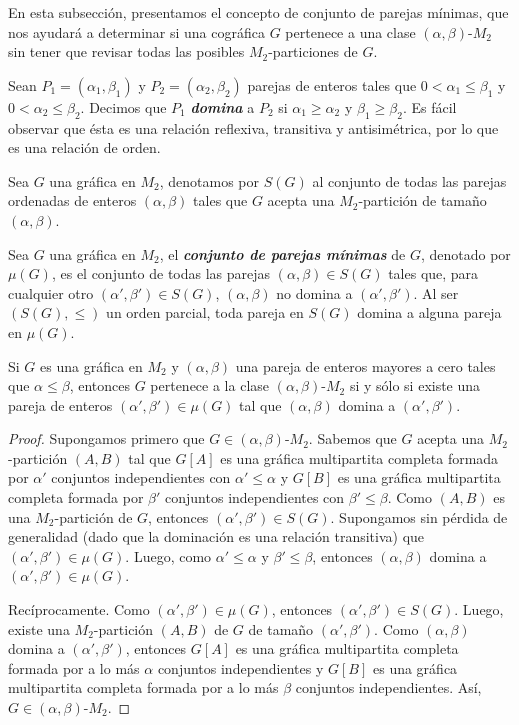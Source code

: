 En esta subsección, presentamos el concepto de conjunto de parejas mínimas, que nos ayudará a determinar si una cográfica $G$ pertenece a una clase $(\alpha, \beta)$-$M_2$ sin tener que revisar todas las posibles $M_2$-particiones de $G$.

Sean $P_1=(\alpha_1, \beta_1)$ y $P_2=(\alpha_2, \beta_2)$ parejas de enteros tales que $0 < \alpha_1 \le \beta_1$ y $0 < \alpha_2 \le \beta_2$. Decimos que $P_1$ \emph{\textbf{domina}} a $P_2$ si $\alpha_1 \geq \alpha_2$ y $\beta_1 \geq \beta_2$. Es f\'acil observar que ésta es una relación reflexiva, transitiva y antisim\'etrica, por lo que es una relaci\'on de orden.

Sea $G$ una gráfica en $M_2$, denotamos por $S(G)$ al conjunto de todas las parejas ordenadas de enteros $(\alpha, \beta)$ tales que $G$ acepta una $M_2$-partición de tamaño $(\alpha, \beta)$.

Sea $G$ una gráfica en $M_2$, el \textbf{\emph{conjunto de parejas mínimas}} de $G$, denotado por $\mu(G)$, es el conjunto de todas las parejas $(\alpha, \beta)\in S(G)$ tales que, para cualquier otro $(\alpha', \beta')\in S(G)$, $(\alpha, \beta)$ no domina a $(\alpha', \beta')$.   Al ser $(S(G), \le)$ un
orden parcial, toda pareja en $S(G)$ domina a alguna pareja en $\mu (G)$.

\begin{lemma}\label{lema_parejas_principal}
Si $G$ es una gráfica en $M_2$ y $(\alpha, \beta)$ una pareja de enteros mayores a cero tales que $\alpha \le \beta$, entonces $G$ pertenece a la clase $(\alpha, \beta)$-$M_2$ si y sólo si existe una pareja de enteros $(\alpha', \beta')\in \mu(G)$ tal que $(\alpha, \beta)$ domina a $(\alpha', \beta')$.
\end{lemma}

\begin{proof}
Supongamos primero que $G\in (\alpha, \beta)\text{-}M_2$. Sabemos que $G$
acepta una $M_2$-partición $(A,B)$ tal que $G[A]$ es una gráfica multipartita
completa formada por $\alpha'$ conjuntos independientes con $\alpha' \le
\alpha$ y $G[B]$ es una gráfica multipartita completa formada por $\beta'$
conjuntos independientes con $\beta' \le \beta$. Como $(A,B)$ es una
$M_2$-partición de $G$, entonces $(\alpha', \beta')\in S(G)$. Supongamos sin
pérdida de generalidad (dado que la dominación es una relación transitiva)
que $(\alpha', \beta')\in \mu(G)$. Luego, como $\alpha' \le \alpha$ y $\beta'
\le \beta$, entonces $(\alpha, \beta)$ domina a $(\alpha', \beta') \in \mu(G)$.

Recíprocamente. Como $(\alpha', \beta')\in \mu(G)$, entonces $(\alpha', \beta')\in S(G)$. Luego, existe una $M_2$-partición $(A,B)$ de $G$ de tamaño $(\alpha', \beta')$. Como $(\alpha, \beta)$ domina a $(\alpha', \beta')$, entonces $G[A]$ es una gráfica multipartita completa formada por a lo más $\alpha$ conjuntos independientes y $G[B]$ es una gráfica multipartita completa formada por a lo más $\beta$ conjuntos independientes. Así, $G\in (\alpha, \beta)\text{-}M_2$.
\end{proof}
